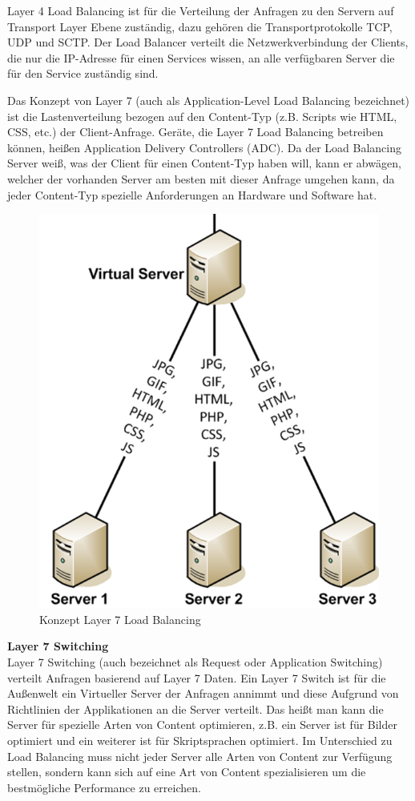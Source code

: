 Layer 4 Load Balancing ist für die Verteilung der Anfragen zu den Servern auf Transport Layer Ebene zuständig, dazu gehören die Transportprotokolle TCP, UDP und SCTP. Der Load Balancer verteilt die Netzwerkverbindung der Clients, die nur die IP-Adresse für einen Services wissen, an alle verfügbaren Server die für den Service zuständig sind.  

Das Konzept von Layer 7 (auch als Application-Level Load Balancing bezeichnet) ist die Lastenverteilung bezogen auf den Content-Typ (z.B. Scripts wie HTML, CSS, etc.) der Client-Anfrage. Geräte, die Layer 7 Load Balancing betreiben können, heißen Application Delivery Controllers (ADC). Da der Load Balancing Server weiß,  was der Client  für einen Content-Typ haben will, kann er abwägen,  welcher der vorhanden Server am besten mit dieser Anfrage umgehen kann, da jeder Content-Typ spezielle Anforderungen an Hardware und Software hat. \cite{LoadBalancing4}

\begin{figure}[!h]
	\begin{center}
		\includegraphics[width=0.3\linewidth]{images/loadbalancing4.jpg}
		\caption{Konzept Layer 7 Load Balancing \cite{LoadBalancing3}}
		\label{Konzept Layer 7 Load Balancing}
	\end{center}
\end{figure}

\textbf{Layer 7 Switching} \\
Layer 7 Switching (auch bezeichnet als Request oder Application Switching) verteilt Anfragen basierend auf Layer 7 Daten. Ein Layer 7 Switch ist für die Außenwelt ein Virtueller Server der Anfragen annimmt und diese Aufgrund von Richtlinien der Applikationen an die Server verteilt. Das heißt man kann die Server für spezielle Arten von Content optimieren, z.B. ein Server ist für Bilder optimiert und ein weiterer ist für Skriptsprachen optimiert. Im Unterschied zu Load Balancing muss nicht jeder Server alle Arten von Content zur Verfügung stellen, sondern kann sich auf eine Art von Content spezialisieren um die bestmögliche Performance zu erreichen. \cite{LoadBalancing3}

